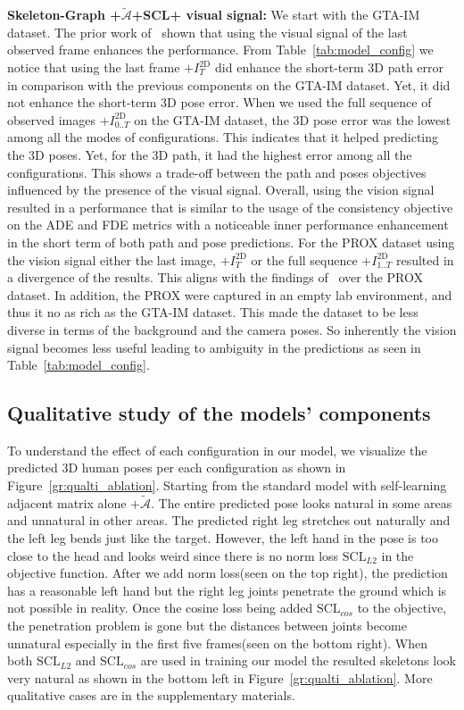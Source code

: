 \documentclass[10pt,twocolumn,letterpaper]{article}
\newcommand*{\ours}{Skeleton-Graph }
\begin{document}
\textbf{\ours +$\tilde{\mathcal{A}}$+SCL+ visual signal: }
We start with the GTA-IM dataset. The prior work of~\cite{cao2020long} shown that using the visual signal of the last observed frame enhances the performance. From Table~\ref{tab:model_config} we notice that using the last frame $+I^\text{2D}_{T}$ did enhance the short-term 3D path error in comparison with the previous components on the GTA-IM dataset. Yet, it did not enhance the short-term 3D pose error. When we used the full sequence of observed images $+I^\text{2D}_{0..T}$ on the GTA-IM dataset, the 3D pose error was the lowest among all the modes of configurations. This indicates that it helped predicting the 3D poses. Yet, for the 3D path, it had the highest error among all the configurations. This shows a trade-off between the path and poses objectives influenced by the presence of the visual signal. Overall, using the vision signal resulted in a performance that is similar to the usage of the consistency objective on the ADE and FDE metrics with a noticeable inner performance enhancement in the short term of both path and pose predictions. For the PROX dataset using the vision signal either the last image, $+I^\text{2D}_{T}$ or the full sequence $+I^\text{2D}_{1..T}$ resulted in a divergence of the results. This aligns with the findings of~\cite{cao2020long} over the PROX dataset. In addition, the PROX were captured in an empty lab environment, and thus it no as rich as the GTA-IM dataset. This made the dataset to be less diverse in terms of the background and the camera poses. So inherently the vision signal becomes less useful leading to ambiguity in the predictions as seen in Table~\ref{tab:model_config}.

\subsection{Qualitative study of the models' components}
To understand the effect of each configuration in our model, we visualize the predicted 3D human poses per each configuration as shown in Figure~\ref{gr:qualti_ablation}. Starting from the standard model with self-learning adjacent matrix alone $+\tilde{\mathcal{A}}$. The entire predicted pose looks natural in some areas and unnatural in other areas. The predicted right leg stretches out naturally and the left leg bends just like the target. However, the left hand in the pose is too close to the head and looks weird since there is no norm loss $\mathrm{SCL}_{L2}$ in the objective function. After we add norm loss(seen on the top right), the prediction has a reasonable left hand but the right leg joints penetrate the ground which is not possible in reality. Once the cosine loss being added $\mathrm{SCL}_{cos}$ to the objective, the penetration problem is gone but the distances between joints become unnatural especially in the first five frames(seen on the bottom right). When both $\mathrm{SCL}_{L2}$ and $\mathrm{SCL}_{cos}$ are used in training our model the resulted skeletons look very natural as shown in the bottom left in Figure~\ref{gr:qualti_ablation}. More qualitative cases are in the supplementary materials. 
\end{document}

